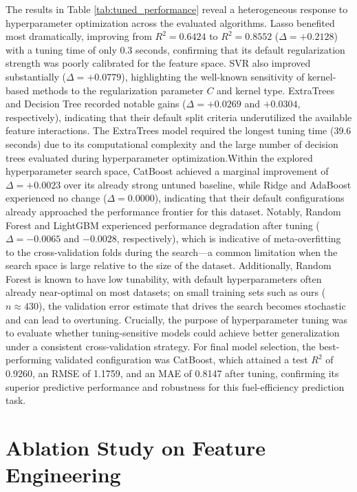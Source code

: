 The results in Table
\ref{tab:tuned_performance}\cite{atique2026explainable} reveal a heterogeneous response to hyperparameter optimization across the evaluated algorithms. Lasso benefited most dramatically, improving from \(R^2 = 0.6424\) to \(R^2 = 0.8552\) (\(\Delta = +0.2128\)) with a tuning time of only 0.3 seconds, confirming that its default regularization strength was poorly calibrated for the feature space. SVR also improved substantially (\(\Delta = +0.0779\)), highlighting the well-known sensitivity of kernel-based methods to the regularization parameter \(C\) and kernel type. ExtraTrees and Decision Tree recorded notable gains (\(\Delta = +0.0269\) and \(+0.0304\), respectively), indicating that their default split criteria underutilized the available feature interactions. The ExtraTrees model required the longest tuning time (39.6 seconds) due to its computational complexity and the large number of decision trees evaluated during hyperparameter optimization.Within the explored hyperparameter search space, CatBoost achieved a marginal improvement of \(\Delta = +0.0023\) over its already strong untuned baseline, while Ridge and AdaBoost experienced no change (\(\Delta = 0.0000\)), indicating that their default configurations already approached the performance frontier for this dataset. Notably, Random Forest and LightGBM experienced performance degradation after tuning (\(\Delta = -0.0065\) and \(-0.0028\), respectively), which is indicative of meta-overfitting to the cross-validation folds during the search—a common limitation when the search space is large relative to the size of the dataset. Additionally, Random Forest is known to have low tunability, with default hyperparameters often already near-optimal on most datasets; on small training sets such as ours (\(n \approx 430\)), the validation error estimate that drives the search becomes stochastic and can lead to overtuning.
Crucially, the purpose of hyperparameter tuning was to evaluate whether tuning-sensitive models could achieve better generalization under a consistent cross-validation strategy. For final model selection, the best-performing validated configuration was CatBoost, which attained a test \(R^2\) of 0.9260, an RMSE of 1.1759, and an MAE of 0.8147 after tuning, confirming its superior predictive performance and robustness for this fuel-efficiency prediction task.


\section{Ablation Study on Feature Engineering}

